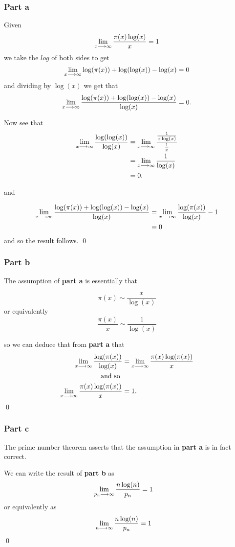 \documentclass{unswmaths}
\begin{document}
\subsubsection*{Part a}
Given
$$
	\lim_{x \longrightarrow \infty} \frac{\pi(x)\log(x)}{x} = 1
$$
we take the $ log $ of both sides to get
$$
	\lim_{x \longrightarrow \infty} \log(\pi(x)) + \log(\log(x)) - \log(x) = 0
$$
and dividing by $ \log(x) $ we get that
$$
	\lim_{x \longrightarrow \infty} \frac{\log(\pi(x)) + \log(\log(x)) - \log(x)}{\log(x)} = 0.
$$

Now see that
\begin{align*}
	\lim_{x \longrightarrow \infty} \frac{\log(\log(x))}{\log(x)} &= \lim_{x \longrightarrow \infty} \frac{\frac{1}{x \log(x)}}{\frac{1}{x}} \\
		&= \lim_{x \longrightarrow \infty} \frac{1}{\log(x)} \\
		&= 0.
\end{align*}

and 

\begin{align*}
	\lim_{x \longrightarrow \infty} \frac{\log(\pi(x)) + \log(\log(x)) - \log(x)}{\log(x)} &= \lim_{x \longrightarrow \infty} \frac{\log(\pi(x))}{\log(x)} - 1 \\
		&= 0
\end{align*}
and so the result follows.
\qed
\subsubsection*{Part b}

The assumption of \textbf{part a} is essentially that

$$
	\pi(x) \sim \frac{x}{\log(x)}
$$
or equivalently 
$$
	\frac{\pi(x)}{x} \sim \frac{1}{\log(x)}
$$

so we can deduce that from \textbf{part a} that
\begin{align*}
	\lim_{x \longrightarrow \infty} \frac{\log(\pi(x))}{\log(x)} &= \lim_{x \longrightarrow \infty} \frac{\pi(x) \log(\pi(x))}{x} \\
		\text{ and so } \\
	\lim_{x \longrightarrow \infty} \frac{\pi(x) \log(\pi(x))}{x} &= 1.
\end{align*}
\qed
\subsubsection*{Part c}
The prime number theorem asserts that the assumption in \textbf{part a} is in fact correct.

We can write the result of \textbf{part b} as
\begin{align*}
	\lim_{p_n \longrightarrow \infty} \frac{n \log(n)}{p_n} &= 1
\end{align*}
or equivalently as
\begin{align*}
	\lim_{n \longrightarrow \infty} \frac{n \log(n)}{p_n} &= 1
\end{align*}
\qed
\end{document}
